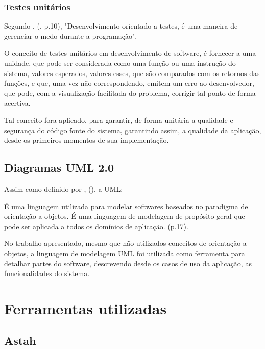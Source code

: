 \subsubsection{Testes unitários}

Segundo , (\citeyear{tdd_by_example}, p.10), "Desenvolvimento orientado a testes, é uma maneira de gerenciar o medo durante a programação".

O conceito de testes unitários em desenvolvimento de software, é fornecer a uma unidade, que pode ser considerada como uma função ou uma instrução do sistema, valores esperados, valores esses, que são comparados com os retornos das funções, e que, uma vez não correspondendo, emitem um erro ao desenvolvedor, que pode, com a visualização facilitada do problema, corrigir tal ponto de forma acertiva.

Tal conceito fora aplicado, para garantir, de forma unitária a qualidade e segurança do código fonte do sistema, garantindo assim, a qualidade da aplicação, desde os primeiros momentos de sua implementação.

\subsection{Diagramas UML 2.0}

Assim como definido por , (\citeyear{uml_pratica}), a UML:

\begin{citacao}
    É uma linguagem utilizada para modelar softwares baseados no paradigma de orientação a objetos. É uma linguagem de modelagem de propósito geral que pode ser aplicada a todos os domínios de aplicação. (p.17).
\end{citacao}

No trabalho apresentado, mesmo que não utilizados conceitos de orientação a objetos, a linguagem de modelagem UML foi utilizada como ferramenta para detalhar partes do software, descrevendo desde os casos de uso da aplicação, as funcionalidades do sistema.

\section{Ferramentas utilizadas}

\subsection{Astah}

